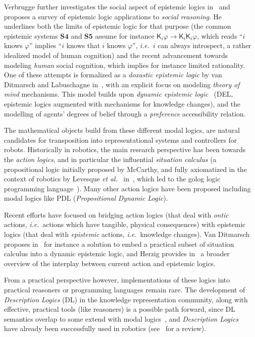 \documentclass{sig-alternate}
\newcommand{\etal}{{\textit{et al.~}}}
\newcommand{\ie}{{\textit{i.e.~}}}
\begin{document}
Verbrugge further investigates the social aspect of epistemic logics
in~\cite{verbrugge2009logic} and proposes a survey of epistemic logic
applications to \emph{social reasoning}. He underlines both the limits of
epistemic logic for that purpose (the common epistemic systems $\mathbf{S4}$ and
$\mathbf{S5}$ assume for instance $\mathsf{K}_{i}\varphi \rightarrow
\mathsf{K}_{i}\mathsf{K}_{i}\varphi$, which reads ``$i$ knows $\varphi$''
implies ``$i$ knows that $i$ knows $\varphi$'', \ie $i$ can always introspect, a
rather idealized model of human cognition) and the recent advancement towards
modeling \emph{human} social cognition, which implies for instance limited
rationality.  One of these attempts is formalized as a \emph{doxastic epistemic
logic} by van Ditmarsch and Labuschagne in~\cite{ditmarsch2007beliefs}, with an
explicit focus on modeling \emph{theory of mind} mechanisms. This model builds
upon \emph{dynamic epistemic logic}~\cite{ditmarsch2007dynamic} (DEL, epistemic
logics augmented with mechanisms for knowledge changes), and the
modelling of agents' degrees of belief through a \emph{preference} accessibility
relation.

The mathematical objects build from these different modal logics, are natural
candidates for transposition into representational systems and controllers for
robots. Historically in robotics, the main research perspective has been towards
the \emph{action logics}, and in particular the influential \emph{situation
calculus} (a propositional logic initially proposed by McCarthy, and fully
axiomatized in the context of robotics by Levesque \etal
in~\cite{levesque1998foundations}, which led to the {\sc golog} logic
programming language~\cite{levesque1997golog}).  Many other action logics have
been proposed including modal logics like PDL (\emph{Propositional Dynamic
Logic}).

Recent efforts have focused on bridging action logics (that deal with
\emph{ontic} actions, \ie actions which have tangible, physical consequences)
with epistemic logics (that deal with \emph{epistemic} actions, \ie knowledge
changes). Van Ditmarsch proposes in~\cite{ditmarsch2010from} for instance a
solution to embed a practical subset of situation calculus into a dynamic
epistemic logic, and Herzig provides in~\cite{herzig2014logics} a broader
overview of the interplay between current action and epistemic logics.

From a practical perspective however, implementations of these logics into
practical reasoners or programming languages remain rare. The development of
\emph{Description Logics} (DL) in the knowledge representation community, along
with effective, practical tools (like reasoners) is a possible path forward,
since DL semantics overlap to some extend with modal logics~\cite[chap.
4.2.2]{baader2003description}, and \emph{Description Logics} have already been
successfully used in robotics (see~\cite{lemaignan2012symbolic} for a review).
\end{document}
